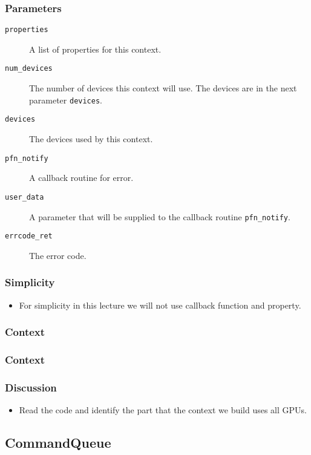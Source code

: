 \documentclass{beamer}
\begin{document}
\begin{frame}
\end{frame}

\begin{frame}
  \frametitle{Parameters}
  \begin{description}
  \item [\tt properties] A list of properties for this context.
  \item [\tt num\_devices] The number of devices this context will
    use. The devices are in the next parameter {\tt devices}.
  \item [\tt devices] The devices used by this context.
  \item [\tt pfn\_notify] A callback routine for error.
  \item [\tt user\_data] A parameter that will be supplied to the
    callback routine {\tt pfn\_notify}.
  \item [\tt errcode\_ret] The error code.
  \end{description}
\end{frame}

\begin{frame}
  \frametitle{Simplicity}
  \begin{itemize}
  \item For simplicity in this lecture we will not use callback
    function and property.
  \end{itemize}
\end{frame}

\begin{frame}
  \frametitle{Context}
\end{frame}

\begin{frame}
  \frametitle{Context}
  \centerline{}
\end{frame}

\begin{frame}
  \frametitle{Discussion}
  \begin{itemize}
  \item Read the code and identify the part that the context we
    build uses all GPUs.
  \end{itemize}
\end{frame}

\subsection{CommandQueue}
\end{document}

